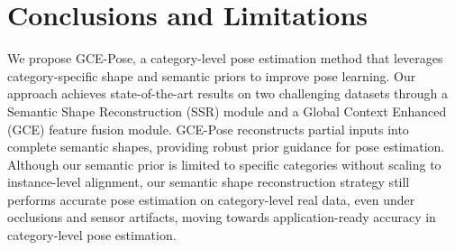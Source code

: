 \section{Conclusions and Limitations} \label{sec:conclusion}
\vspace{-0.1cm}
We propose GCE-Pose, a category-level pose estimation method that leverages category-specific shape and semantic priors to improve pose learning. Our approach achieves state-of-the-art results on two challenging datasets through a Semantic Shape Reconstruction (SSR) module and a Global Context Enhanced (GCE) feature fusion module. GCE-Pose reconstructs partial inputs into complete semantic shapes, providing robust prior guidance for pose estimation. Although our semantic prior is limited to specific categories without scaling to instance-level alignment, our semantic shape reconstruction strategy still performs accurate pose estimation on category-level real data, even under occlusions and sensor artifacts, moving towards application-ready accuracy in category-level pose estimation.
